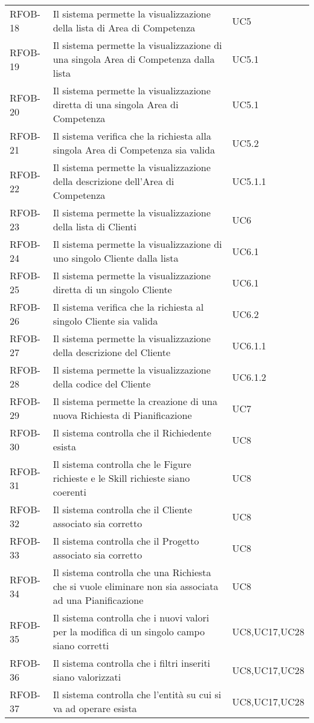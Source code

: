 \begin{center}
\begin{longtable}{p{2.0cm}|p{8cm}|p{2.7cm}}
RFOB-18  & Il sistema permette la visualizzazione della lista di Area di Competenza & UC5 \\ 
RFOB-19  & Il sistema permette la visualizzazione di una singola Area di Competenza dalla lista & UC5.1 \\ 
RFOB-20  & Il sistema permette la visualizzazione diretta di una singola Area di Competenza & UC5.1 \\ 
RFOB-21  & Il sistema verifica che la richiesta alla singola Area di Competenza sia valida & UC5.2 \\ 
RFOB-22  & Il sistema permette la visualizzazione della descrizione dell'Area di Competenza & UC5.1.1 \\ 
RFOB-23  & Il sistema permette la visualizzazione della lista di Clienti & UC6 \\ 
RFOB-24  & Il sistema permette la visualizzazione di uno singolo Cliente dalla lista & UC6.1 \\ 
RFOB-25  & Il sistema permette la visualizzazione diretta di un singolo Cliente & UC6.1 \\ 
RFOB-26  & Il sistema verifica che la richiesta al singolo Cliente sia valida & UC6.2 \\ 
RFOB-27  & Il sistema permette la visualizzazione della descrizione del Cliente & UC6.1.1\\ 
RFOB-28  & Il sistema permette la visualizzazione della codice del Cliente & UC6.1.2 \\ 

RFOB-29  & Il sistema permette la creazione di una nuova Richiesta di Pianificazione & UC7 \\ 
RFOB-30  & Il sistema controlla che il Richiedente esista & UC8 \\ 
RFOB-31  & Il sistema controlla che le Figure richieste e le Skill richieste siano coerenti & UC8 \\ 
RFOB-32  & Il sistema controlla che il Cliente associato sia corretto & UC8 \\ 
RFOB-33  & Il sistema controlla che il Progetto associato sia corretto & UC8 \\ 
RFOB-34  & Il sistema controlla che una Richiesta che si vuole eliminare non sia associata ad una Pianificazione & UC8 \\ 
RFOB-35 & Il sistema controlla che i nuovi valori per la modifica di un singolo campo siano corretti & UC8,UC17,UC28\\
RFOB-36  & Il sistema controlla che i filtri inseriti siano valorizzati & UC8,UC17,UC28 \\ 
RFOB-37  & Il sistema controlla che l'entità su cui si va ad operare esista & UC8,UC17,UC28 \\ 



\end{longtable}
\end{center}
